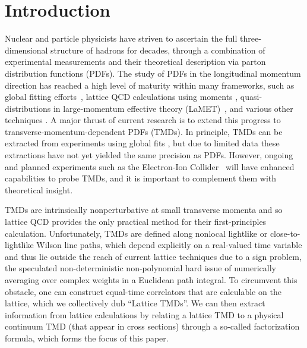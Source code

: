\documentclass[11pt,a4paper]{article}
\begin{document}
\section{Introduction}
\label{sec:intro}

Nuclear and particle physicists have striven to ascertain the full three-dimensional structure of hadrons for decades, through a combination of experimental measurements and their theoretical description via parton distribution functions (PDFs). 
The study of PDFs in the longitudinal momentum direction has reached a high level of maturity within many frameworks, such as global fitting efforts~\cite{Buckley:2014ana,Harland-Lang:2014zoa,Dulat:2015mca,Alekhin:2017kpj,NNPDF:2017mvq,Hou:2019qau,Bailey:2020ooq,Ball:2021leu}, lattice QCD calculations using moments \cite{Kronfeld:1984zv,Martinelli:1987si,Best:1997qp}, quasi-distributions in large-momentum effective theory (LaMET)~\cite{Ji:2013dva,Ji:2014gla,Ji:2020ect}, and various other techniques \cite{Liu:1993cv,Davoudi:2012ya,Detmold:2005gg,Chambers:2017dov,Braun:2007wv,Radyushkin:2017cyf,Orginos:2017kos,Ma:2017pxb}.
A major thrust of current research is to extend this progress to transverse-momentum-dependent PDFs (TMDs).
In principle, TMDs can be extracted from experiments using global fits \cite{Scimemi:2019cmh, Bacchetta:2019sam},
but due to limited data these extractions have not yet yielded the same precision as PDFs.
However, ongoing and planned experiments such as the Electron-Ion Collider~\cite{Accardi:2012qut,AbdulKhalek:2021gbh} will have enhanced capabilities to probe TMDs,
and it is important to complement them with theoretical insight. 

TMDs are intrinsically nonperturbative at small transverse momenta and so lattice QCD provides the only practical method for their first-principles calculation.
Unfortunately, TMDs are defined along nonlocal lightlike or close-to-lightlike Wilson line paths, which depend explicitly on a real-valued time variable and thus lie outside the reach of current lattice techniques due to a sign problem, the speculated non-deterministic non-polynomial hard issue of numerically averaging over complex weights in a Euclidean path integral.
To circumvent this obstacle, one can construct equal-time correlators that are calculable on the lattice, which we collectively dub ``Lattice TMDs''.
We can then extract information from lattice calculations by relating a lattice TMD to a physical continuum TMD (that appear in cross sections) through a so-called factorization formula, which forms the focus of this paper. 
\end{document}
